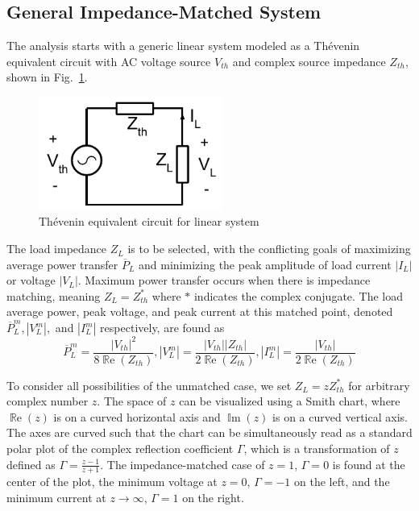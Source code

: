 \documentclass{ifacconf}
\renewcommand{\Re}{\operatorname{\mathbb{R}e}}
\renewcommand{\Im}{\operatorname{\mathbb{I}m}}
\begin{document}
\subsection{General Impedance-Matched System}
The analysis starts with a generic linear system modeled as a Thévenin equivalent circuit with AC voltage source $V_{th}$ and complex source impedance $Z_{th}$, shown in Fig.~\ref{fig:circuit}.
\begin{figure}
\begin{center}
\includegraphics[width=6cm]{ifacconf_latex/figs/IFAC CAMS Circuit drawing.pdf}    %
\caption{Thévenin equivalent circuit for linear system} 
\label{fig:circuit}
\end{center}
\end{figure}
The load impedance $Z_L$ is to be selected, with the conflicting goals of maximizing average power transfer $\overline{P}_L$ and minimizing the peak amplitude of load current $|I_L|$ or voltage $|V_L|$. Maximum power transfer occurs when there is impedance matching, meaning $Z_L = Z_{th}^*$ where $*$ indicates the complex conjugate. The load average power, peak voltage, and peak current at this matched point, denoted $\overline{P}_L^m, |V_L^m|,$ and $|I_L^m|$ respectively, are found as
\begin{equation}\label{eq:matched-values}
    \overline{P}_L^m = \frac{|V_{th}|^2}{8 \Re(Z_{th})}, 
    |V_L^m| = \frac{|V_{th}| |Z_{th}|} {2 \Re(Z_{th})}, 
    |I_L^m| = \frac{|V_{th}|}{2 \Re(Z_{th})}
\end{equation}

To consider all possibilities of the unmatched case, we set $Z_L = z Z_{th}^*$ for arbitrary complex number $z$. The space of $z$ can be visualized using a Smith chart, where $\Re(z)$ is on a curved horizontal axis and $\Im(z)$ is on a curved vertical axis. The axes are curved such that the chart can be simultaneously read as a standard polar plot of the complex reflection coefficient $\Gamma$, which is a transformation of $z$ defined as $\Gamma = \frac{z-1}{z+1}$. The impedance-matched case of $z=1$, $\Gamma = 0$ is found at the center of the plot, the minimum voltage at $z=0$, $\Gamma = -1$ on the left, and the minimum current at $z \rightarrow \infty$, $\Gamma = 1$ on the right.
\end{document}
